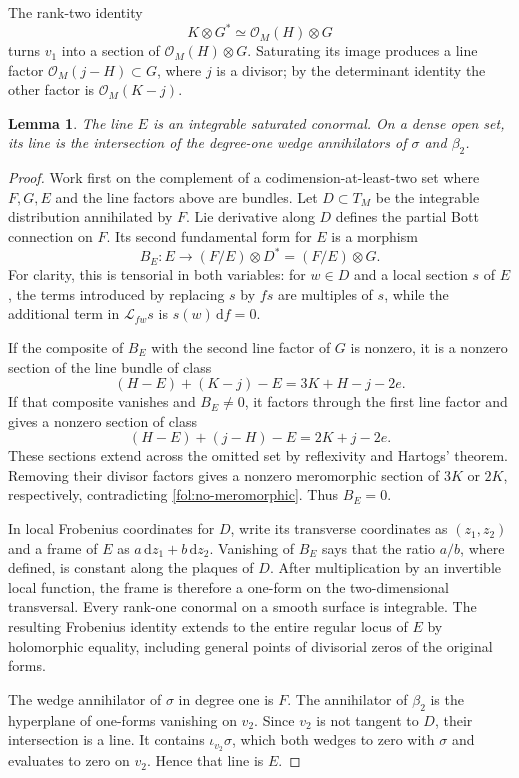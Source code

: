 \documentclass[11pt,letterpaper]{article}
\newtheorem{lemma}[theorem]{Lemma}
\theoremstyle{definition}
\theoremstyle{remark}
\begin{document}
The rank-two identity
\[
 K\otimes G^*\simeq\mathcal{O}_M(H)\otimes G
\]
turns $v_1$ into a section of $\mathcal{O}_M(H)\otimes G$.  Saturating its image
produces a line factor $\mathcal{O}_M(j-H)\subset G$, where $j$ is a divisor;
by the determinant identity the other factor is $\mathcal{O}_M(K-j)$.

\begin{lemma}\label{fol:Bott-integrability}
The line $E$ is an integrable saturated conormal.  On a dense open set,
its line is the intersection of the degree-one wedge annihilators of
$\sigma$ and $\beta_2$.
\end{lemma}

\begin{proof}
Work first on the complement of a codimension-at-least-two set where
$F,G,E$ and the line factors above are bundles.  Let $D\subset T_M$ be
the integrable distribution annihilated by $F$.  Lie derivative along
$D$ defines the partial Bott connection on $F$.  Its second fundamental
form for $E$ is a morphism
\begin{equation}\label{fol:Bott-tensor}
 B_E\colon E\longrightarrow(F/E)\otimes D^*
                 =(F/E)\otimes G.
\end{equation}
For clarity, this is tensorial in both variables: for $w\in D$ and a
local section $s$ of $E$, the terms introduced by replacing $s$ by $fs$
are multiples of $s$, while the additional term in $\mathcal L_{fw}s$
is $s(w)\,\mathrm{d} f=0$.

If the composite of $B_E$ with the second line factor of $G$ is nonzero,
it is a nonzero section of the line bundle of class
\[
 (H-E)+(K-j)-E=3K+H-j-2e.
\]
If that composite vanishes and $B_E\ne0$, it factors through the first
line factor and gives a nonzero section of class
\[
 (H-E)+(j-H)-E=2K+j-2e.
\]
These sections extend across the omitted set by reflexivity and Hartogs'
theorem.  Removing their divisor factors gives a nonzero meromorphic
section of $3K$ or $2K$, respectively, contradicting
\eqref{fol:no-meromorphic}.  Thus $B_E=0$.

In local Frobenius coordinates for $D$, write its transverse coordinates
as $(z_1,z_2)$ and a frame of $E$ as $a\,\mathrm{d} z_1+b\,\mathrm{d} z_2$.
Vanishing of $B_E$ says that the ratio $a/b$, where defined, is constant
along the plaques of $D$.  After multiplication by an invertible local
function, the frame is therefore a one-form on the two-dimensional
transversal.  Every rank-one conormal on a smooth surface is integrable.
The resulting Frobenius identity extends to the entire regular locus
of $E$ by holomorphic equality, including general points of divisorial
zeros of the original forms.

The wedge annihilator of $\sigma$ in degree one is $F$.  The annihilator
of $\beta_2$ is the hyperplane of one-forms vanishing on $v_2$.  Since
$v_2$ is not tangent to $D$, their intersection is a line.  It contains
$\iota_{v_2}\sigma$, which both wedges to zero with $\sigma$ and
evaluates to zero on $v_2$.  Hence that line is $E$.
\end{proof}
\end{document}
